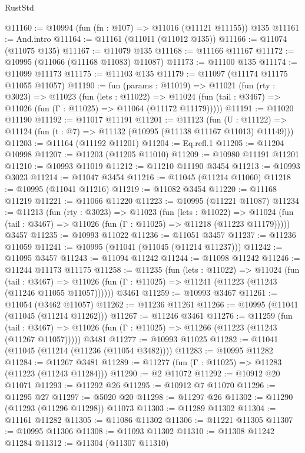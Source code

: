 \begin{lexlean}{RustStd}
\begin{coremodule}
@11160 := @10994 (fun (fn : @107) => @11016 (@11121 @11155)) @135
@11161 := And.intro
@11164 := @11161 (@11011 (@11012 @135))
@11166 := @11074 (@11075 @135)
@11167 := @11079 @135
@11168 := @11166 @11167
@11172 := @10995 (@11066 (@11168 @11083) @11087)
@11173 := @11100 @135
@11174 := @11099 @11173
@11175 := @11103 @135
@11179 := @11097 (@11174 @11175 @11055 @11057)
@11190 := fun (params : @11019) =>
  @11021
    (fun (rty : @3023) =>
    @11023
      (fun (lets : @11022) =>
      @11024 (fun (tail : @3467) => @11026 (fun (Γ : @11025) => @11064 (@11172 @11179)))))
@11191 := @11020 @11190
@11192 := @11017 @11191
@11201 := @11123
    (fun (U : @11122) => @11124 (fun (t : @7) => @11132 (@10995 (@11138 @11167 @11013) @11149)))
@11203 := @11164 (@11192 @11201)
@11204 := Eq.refl.{1}
@11205 := @11204 @10998
@11207 := @11203 (@11205 @11010)
@11209 := @10980 @11191 @11201
@11210 := @10993 @11019
@11212 := @11210 @11190 @3454
@11213 := @10993 @3023
@11214 := @11047 @3454
@11216 := @11045 (@11214 @11060)
@11218 := @10995 (@11041 @11216)
@11219 := @11082 @3454
@11220 := @11168 @11219
@11221 := @11066 @11220
@11223 := @10995 (@11221 @11087)
@11234 := @11213
    (fun (rty : @3023) =>
    @11023
      (fun (lets : @11022) =>
      @11024 (fun (tail : @3467) => @11026 (fun (Γ : @11025) => @11218 (@11223 @11179)))))
    @3457
@11235 := @10993 @11022
@11236 := @11051 @3457
@11237 := @11236 @11059
@11241 := @10995 (@11041 (@11045 (@11214 @11237)))
@11242 := @11095 @3457
@11243 := @11094 @11242
@11244 := @11098 @11242
@11246 := @11244 @11173 @11175
@11258 := @11235
    (fun (lets : @11022) =>
    @11024
      (fun (tail : @3467) =>
      @11026 (fun (Γ : @11025) => @11241 (@11223 (@11243 (@11246 @11055 @11057))))))
    @3461
@11259 := @10993 @3467
@11261 := @11054 (@3462 @11057)
@11262 := @11236 @11261
@11266 := @10995 (@11041 (@11045 (@11214 @11262)))
@11267 := @11246 @3461
@11276 := @11259
    (fun (tail : @3467) => @11026 (fun (Γ : @11025) => @11266 (@11223 (@11243 (@11267 @11057)))))
    @3481
@11277 := @10993 @11025
@11282 := @11041 (@11045 (@11214 (@11236 (@11054 @3482))))
@11283 := @10995 @11282
@11284 := @11267 @3481
@11289 := @11277 (fun (Γ : @11025) => @11283 (@11223 (@11243 @11284)))
@11290 := @2 @11072
@11292 := @10912 @20 @11071
@11293 := @11292 @26
@11295 := @10912 @7 @11070
@11296 := @11295 @27
@11297 := @5020 @20
@11298 := @11297 @26
@11302 := @11290 (@11293 (@11296 @11298)) @11073
@11303 := @11289 @11302
@11304 := @11161 @11282
@11305 := @11086 @11302
@11306 := @11221 @11305
@11307 := @10995 @11306
@11308 := @11093 @11302
@11310 := @11308 @11242 @11284
@11312 := @11304 (@11307 @11310)

\end{coremodule}
\end{lexlean}
